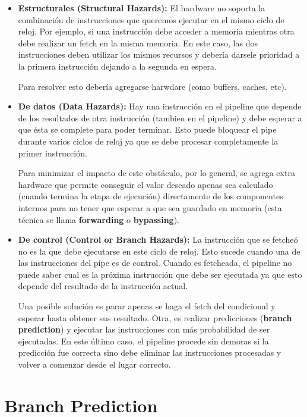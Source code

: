 \begin{itemize}
	\item \textbf{Estructurales (Structural Hazards):} El hardware no soporta la combinación de instrucciones que queremos ejecutar en el mismo ciclo de reloj. Por ejemplo, si una instrucción debe acceder a memoria mientras otra debe realizar un fetch en la misma memoria. En este caso, las dos instrucciones deben utilizar los mismos recursos y debería darsele prioridad a la primera instrucción dejando a la segunda en espera.
	
	Para resolver esto debería agregarse harwdare (como buffers, caches, etc).
	\item \textbf{De datos (Data Hazards):} Hay una instrucción en el pipeline que depende de los resultados de otra instrucción (tambien en el pipeline) y debe esperar a que ésta se complete para poder terminar. Esto puede bloquear el pipe durante varios ciclos de reloj ya que se debe procesar completamente la primer instrucción. 
	
	Para minimizar el impacto de este obstáculo, por lo general, se agrega extra hardware que permite conseguir el valor deseado apenas sea calculado (cuando termina la etapa de ejecución) directamente de los componentes internos para no tener que esperar a que sea guardado en memoria (esta técnica se llama \textbf{forwarding} o \textbf{bypassing}).
	\item \textbf{De control (Control or Branch Hazards):} La instrucción que se fetcheó no es la que debe ejecutarse en este ciclo de reloj. Esto sucede cuando una de las instrucciones del pipe es de control. Cuando es fetcheada, el pipeline no puede saber cual es la próxima instrucción que debe ser ejecutada ya que esto depende del resultado de la instrucción actual.
	
	Una posible solución es parar apenas se haga el fetch del condicional y esperar hasta obtener sus resultado. Otra, es realizar predicciones (\textbf{branch prediction}) y ejecutar las instrucciones con más probabilidad de ser ejecutadas. En este último caso, el pipeline procede sin demoras si la predicción fue correcta sino debe eliminar las instrucciones procesadas y volver a comenzar desde el lugar correcto.
\end{itemize}

\newpage
\section{Branch Prediction}\label{sec::branchPrediction}

